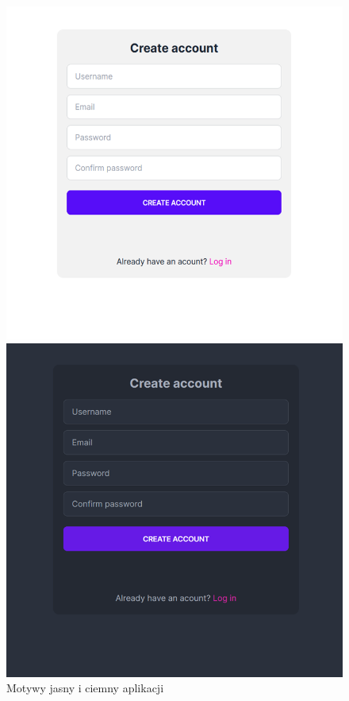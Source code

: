 \begin{figure}[h!]
  \centering
  \begin{minipage}[b]{0.45\textwidth}
    \centering
    \includegraphics[width=\textwidth]{img/widoki/light.png}
  \end{minipage}%
  \hspace*{0.5cm}
  \begin{minipage}[b]{0.45\textwidth}
    \centering
    \includegraphics[width=\textwidth]{img/widoki/dark.png}
  \end{minipage}
  \caption{Motywy jasny i ciemny aplikacji}
  \label{fig:themes_ui}
\end{figure}

